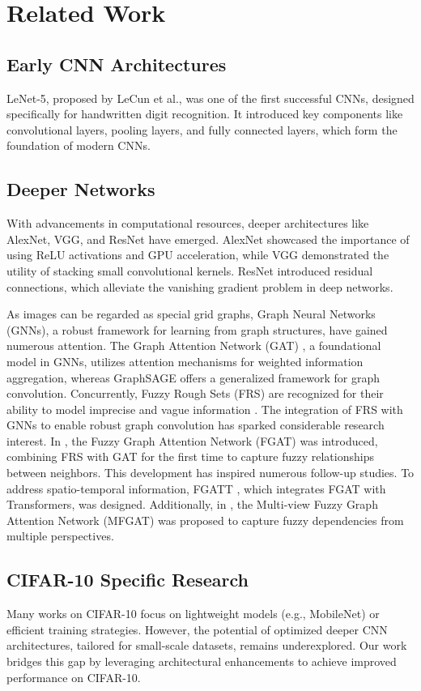 \section{Related Work}
\subsection{Early CNN Architectures}
LeNet-5, proposed by LeCun et al., was one of the first successful CNNs, designed specifically for handwritten digit recognition. It introduced key components like convolutional layers, pooling layers, and fully connected layers, which form the foundation of modern CNNs.
\subsection{Deeper Networks}
With advancements in computational resources, deeper architectures like AlexNet, VGG, and ResNet have emerged. AlexNet showcased the importance of using ReLU activations and GPU acceleration, while VGG demonstrated the utility of stacking small convolutional kernels. ResNet introduced residual connections, which alleviate the vanishing gradient problem in deep networks.

As images can be regarded as special grid graphs, Graph Neural Networks (GNNs), a robust framework for learning from graph structures, have gained numerous attention. The Graph Attention Network (GAT) \cite{petar17gat}, a foundational model in GNNs, utilizes attention mechanisms for weighted information aggregation, whereas GraphSAGE \cite{ham17graphsage} offers a generalized framework for graph convolution. Concurrently, Fuzzy Rough Sets (FRS) are recognized for their ability to model imprecise and vague information \cite{xing2022weighted, gao2022parameterized}. The integration of FRS with GNNs to enable robust graph convolution has sparked considerable research interest. In \cite{xing24enhancing}, the Fuzzy Graph Attention Network (FGAT) was introduced, combining FRS with GAT for the first time to capture fuzzy relationships between neighbors. This development has inspired numerous follow-up studies. To address spatio-temporal information, FGATT \cite{xing24fgatt}, which integrates FGAT with Transformers, was designed. Additionally, in \cite{xing24mfgat}, the Multi-view Fuzzy Graph Attention Network (MFGAT) was proposed to capture fuzzy dependencies from multiple perspectives.
\subsection{CIFAR-10 Specific Research}
Many works on CIFAR-10 focus on lightweight models (e.g., MobileNet) or efficient training strategies. However, the potential of optimized deeper CNN architectures, tailored for small-scale datasets, remains underexplored. Our work bridges this gap by leveraging architectural enhancements to achieve improved performance on CIFAR-10.